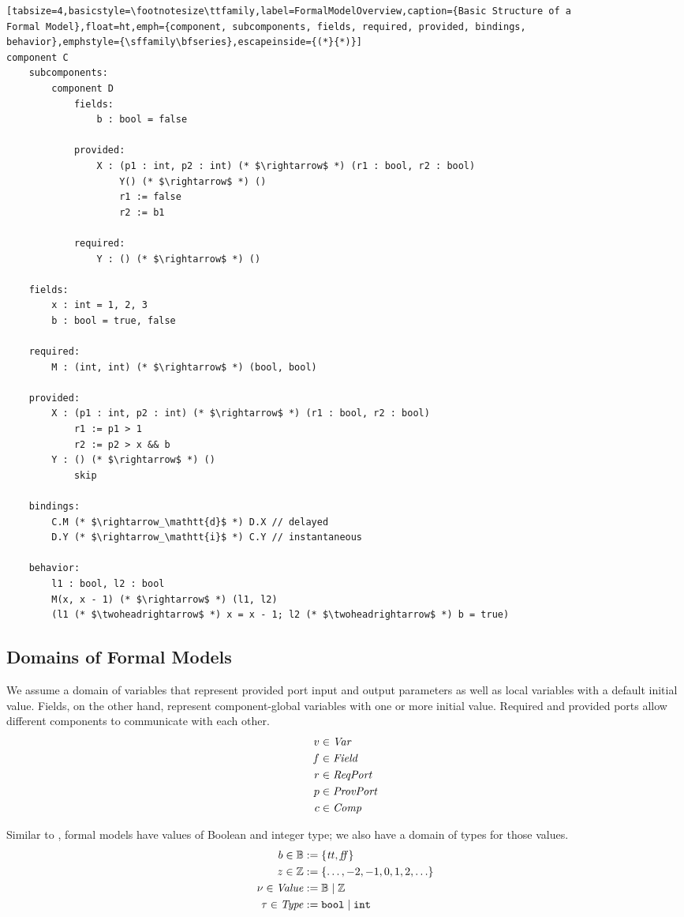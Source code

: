 \documentclass[a4paper,10pt,english]{article}
\begin{document}
\begin{lstlisting}[tabsize=4,basicstyle=\footnotesize\ttfamily,label=FormalModelOverview,caption={Basic Structure of a
Formal Model},float=ht,emph={component, subcomponents, fields, required, provided, bindings,
behavior},emphstyle={\sffamily\bfseries},escapeinside={(*}{*)}]
component C
	subcomponents:
		component D
			fields:
				b : bool = false
				
			provided:
				X : (p1 : int, p2 : int) (* $\rightarrow$ *) (r1 : bool, r2 : bool)
					Y() (* $\rightarrow$ *) ()
					r1 := false
					r2 := b1
					
			required:
				Y : () (* $\rightarrow$ *) ()

	fields:
		x : int = 1, 2, 3
		b : bool = true, false
		
	required:
		M : (int, int) (* $\rightarrow$ *) (bool, bool)
		
	provided:
		X : (p1 : int, p2 : int) (* $\rightarrow$ *) (r1 : bool, r2 : bool)
			r1 := p1 > 1
			r2 := p2 > x && b
		Y : () (* $\rightarrow$ *) ()
			skip
		
	bindings:
		C.M (* $\rightarrow_\mathtt{d}$ *) D.X // delayed
		D.Y (* $\rightarrow_\mathtt{i}$ *) C.Y // instantaneous
	
	behavior:
		l1 : bool, l2 : bool
		M(x, x - 1) (* $\rightarrow$ *) (l1, l2)
		(l1 (* $\twoheadrightarrow$ *) x = x - 1; l2 (* $\twoheadrightarrow$ *) b = true)
\end{lstlisting}

\subsection{Domains of Formal Models}
We assume a domain of variables that represent provided port input and output parameters as well as local variables with a default
initial value. Fields, on the other hand, represent component-global variables with one or more initial value. Required and
provided ports allow different components to communicate with each other.
\begin{align*}
	v &\in \mathit{Var} \\
	f &\in \mathit{Field} \\
	r &\in \mathit{ReqPort} \\
	p &\in \mathit{ProvPort} \\
	c&\in \mathit{Comp}
\end{align*}

Similar to \Fil, formal models have values of Boolean and integer type; we also have a domain of types
for those values.
\begin{align*}
    b \in \mathbb{B} &:= \{ \mathit{tt}, \mathit{ff} \}
    \\
    z \in \mathbb{Z} &:= \{ \ldots, -2, -1, 0, 1, 2, \ldots \}
    \\
    \nu \in \mathit{Value} &:= \mathbb{B} \mid \mathbb{Z}
    \\
	\tau \in \mathit{Type} &:= \mathtt{bool} \mid \mathtt{int}
\end{align*}
\end{document}
